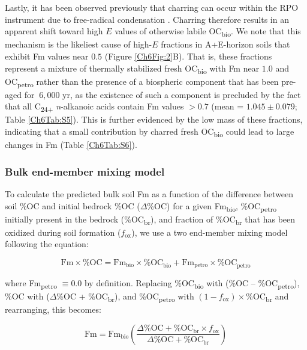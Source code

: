 Lastly, it has been observed previously that charring can occur within the RPO instrument due to free-radical condensation \citep[Chapter \ref{Ch3}]{Williams:2014bq}. Charring therefore results in an apparent shift toward high $E$ values of otherwise labile OC\textsubscript{bio}. We note that this mechanism is the likeliest cause of high-$E$ fractions in A+E-horizon soils that exhibit Fm values near $0.5$ (Figure \ref{Ch6Fig:2}B). That is, these fractions represent a mixture of thermally stabilized fresh OC\textsubscript{bio} with Fm near $1.0$ and OC\textsubscript{petro} rather than the presence of a biospheric component that has been pre-aged for $~ 6,000$  yr, as the existence of such a component is precluded by the fact that all C\textsubscript{24+} \textit{n}-alkanoic acids contain Fm values $> 0.7$ (mean = $1.045 \pm 0.079$; Table \ref{Ch6Tab:S5}). This is further evidenced by the low mass of these fractions, indicating that a small contribution by charred fresh OC\textsubscript{bio} \citep[$\approx 5$\% of low-$E$ material;][]{Williams:2014bq} could lead to large changes in Fm (Table \ref{Ch6Tab:S6}).

\subsubsection{Bulk end-member mixing model}\label{Ch6SD3}

To calculate the predicted bulk soil Fm as a function of the difference between soil \%OC and initial bedrock \%OC ($\Delta$\%OC) for a given Fm\textsubscript{bio}, \%OC\textsubscript{petro} initially present in the bedrock (\%OC\textsubscript{br}), and fraction of \%OC\textsubscript{br} that has been oxidized during soil formation ($f_{\text{ox}}$), we use a two end-member mixing model following the equation:

\begin{equation}\label{Ch6Eq:4}
	\text{Fm}\times \text{\%OC} = \text{Fm}_{\text{bio}}\times \text{\%OC}_{\text{bio}} + \text{Fm}_{\text{petro}}\times \text{\%OC}_{\text{petro}}
\end{equation}

where Fm\textsubscript{petro} $\equiv 0.0$ by definition. Replacing \%OC\textsubscript{bio} with (\%OC -- \%OC\textsubscript{petro}), \%OC with ($\Delta$\%OC + \%OC\textsubscript{br}), and \%OC\textsubscript{petro} with $(1 - f_{\text{ox}})\times$\%OC\textsubscript{br} and rearranging, this becomes: 

\begin{equation}\label{Ch6Eq:5}
	\text{Fm} = \text{Fm}_{\text{bio}} \left( \frac{\Delta \text{\%OC} + \text{\%OC}_{\text{br}} \times f_{\text{ox}}}{\Delta \text{\%OC} + \text{\%OC}_{\text{br}}} \right)
\end{equation}

